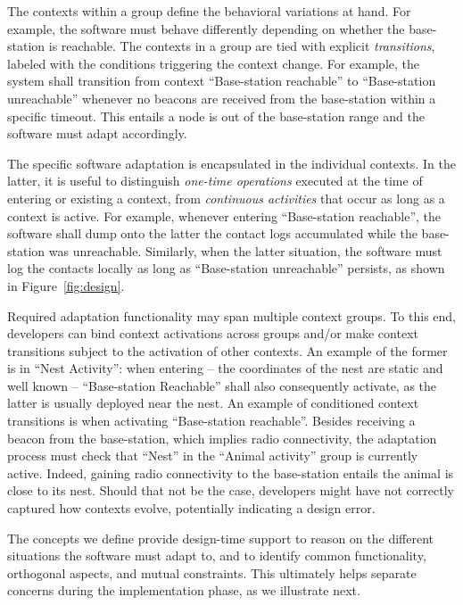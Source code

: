 The contexts within a group define the behavioral variations at
hand. For example, the software must behave differently depending on
whether the base-station is reachable.  The contexts in a group are
tied with explicit \emph{transitions}, labeled with the conditions
triggering the context change. For example, the system shall
transition from context ``Base-station reachable'' to ``Base-station
unreachable'' whenever no beacons are received from the base-station
within a specific timeout. This entails a node is out of the
base-station range and the software must adapt accordingly.

The specific software adaptation is encapsulated in the individual
contexts. In the latter, it is useful to distinguish \emph{one-time
  operations} executed at the time of entering or existing a context,
from \emph{continuous activities} that occur as long as a context is
active. For example, whenever entering ``Base-station reachable'', the
software shall dump onto the latter the contact logs
accumulated while the base-station was unreachable. Similarly, when
the latter situation, the software must log the contacts locally as
long as ``Base-station unreachable'' persists, as shown in
Figure~\ref{fig:design}.

Required adaptation functionality may span multiple context groups. To
this end, developers can bind context activations across groups and/or
make context transitions subject to the activation of other
contexts. An example of the former is in ``Nest Activity'': when entering --
the coordinates of the nest are static and well known -- ``Base-station
Reachable'' shall also consequently activate, as the latter is usually deployed
near the nest. An example of conditioned context transitions is when activating
``Base-station reachable''. Besides receiving a beacon from the
base-station, which implies radio connectivity, the adaptation process
must check that ``Nest'' in the ``Animal activity'' group is
currently active. Indeed, gaining radio connectivity to the
base-station entails the animal is close to its nest. Should that not be the
case, developers might have not correctly captured how contexts
evolve, potentially indicating a design error.

The concepts we define provide design-time support to reason on the
different situations the software must adapt to, and to identify common
functionality, orthogonal aspects, and mutual constraints. This
ultimately helps separate concerns during the implementation phase, as
we illustrate next.




